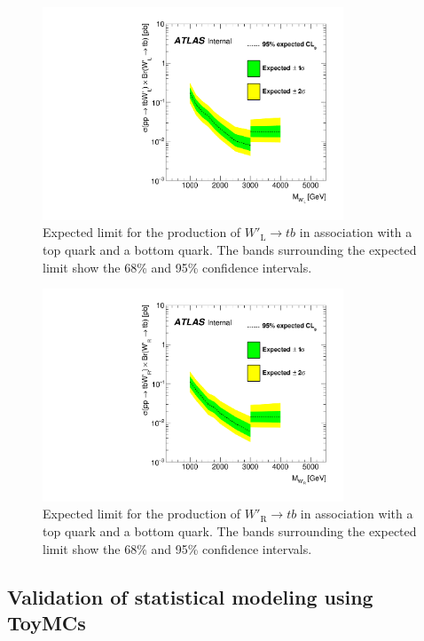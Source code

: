 \begin{figure}[H]
  \centering
  \includegraphics[width=0.8\textwidth]{images/ProfileLHFit/XSUpperLimits_Wp-LH.pdf}
  \caption{Expected limit for the production of $W'_{\text{L}}{\rightarrow}tb$ in association with a top quark and a bottom quark. The bands surrounding the expected limit show the 68\% and 95\% confidence intervals.}
  \label{fig:XSLimits_WpLH}
\end{figure}


\begin{figure}[H]
  \centering
  \includegraphics[width=0.8\textwidth]{images/ProfileLHFit/XSUpperLimits_Wp-RH.pdf}
  \caption{Expected limit for the production of $W'_{\text{R}}{\rightarrow}tb$ in association with a top quark and a bottom quark. The bands surrounding the expected limit show the 68\% and 95\% confidence intervals.}
  \label{fig:XSLimits_WpRH}
\end{figure}
\subsection{Validation of statistical modeling using ToyMCs}
